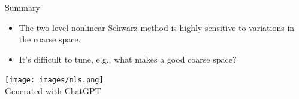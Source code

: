 \begin{frame}{Summary}
	\begin{itemize}
		\item The two-level nonlinear Schwarz method is highly sensitive to variations in the coarse space.
		\item It's difficult to tune, e.g., what makes a good coarse space?%
	\end{itemize}
	\vspace{4mm}
	\begin{center}
		\texttt{[image: images/nls.png]}\\
		{\tiny \vspace{-2mm}\hspace{-4.7cm}Generated with ChatGPT}
	\end{center}
\end{frame}




